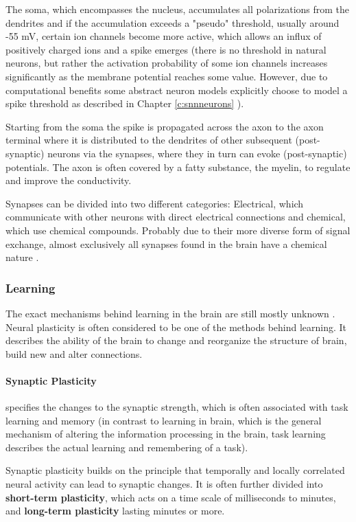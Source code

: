 The soma, which encompasses the nucleus, accumulates all polarizations from the dendrites and if the accumulation exceeds a "pseudo" threshold, usually around -55 mV, certain ion channels become more active, which allows an influx of positively charged ions and a spike emerges (there is no threshold in natural neurons, but rather the activation probability of some ion channels increases significantly as the membrane potential reaches some value. However, due to computational benefits some abstract neuron models explicitly choose to model a spike threshold as described in Chapter \ref{c:snnneurons} ).

Starting from the soma the spike is propagated across the axon to the axon terminal where it is distributed to the dendrites of other subsequent (post-synaptic) neurons via the synapses, where they in turn can evoke (post-synaptic) potentials.
The axon is often covered by a fatty substance, the myelin, to regulate and improve the conductivity.

Synapses can be divided into two different categories: Electrical, which communicate with other neurons with direct electrical connections and chemical, which use chemical compounds.
Probably due to their more diverse form of signal exchange, almost exclusively all synapses found in the brain have a chemical nature \cite{Byrne1997}.

\subsubsection{Learning} \label{c:natlearning}

The exact mechanisms behind learning in the brain are still mostly unknown \cite{Byrne1997}\cite{gerstner2014neuronal}\cite{Markram2012}.
Neural plasticity is often considered to be one of the methods behind learning. 
It describes the ability of the brain to change and reorganize the structure of brain, build new and alter connections.  

\paragraph{Synaptic Plasticity} \label{c:synplasiticity}
specifies the changes to the synaptic strength, which is often associated with task learning and memory (in contrast to learning in brain, which is the general mechanism of altering the information processing in the brain, task learning describes the actual learning and remembering of a task). 

Synaptic plasticity builds on the principle that temporally and locally correlated neural activity  can lead to synaptic changes.
It is often further divided into \textbf{short-term plasticity}, which acts on a time scale of milliseconds to minutes, and \textbf{long-term plasticity} lasting minutes or more.


